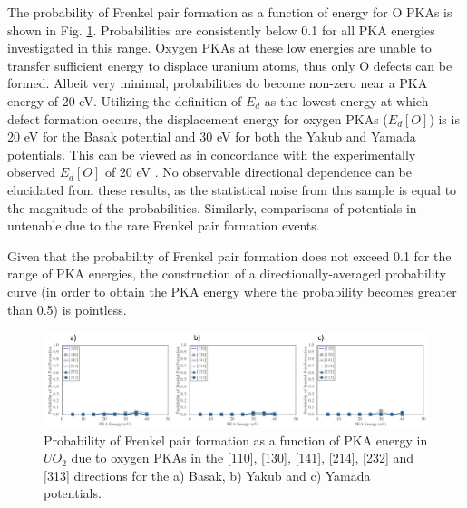 \documentclass[8pt]{article}   	%
\begin{document}
The probability of Frenkel pair formation as a function of energy for O PKAs is shown in Fig. \ref{fig:fpo}. Probabilities are consistently below 0.1 for all PKA energies investigated in this range. Oxygen PKAs at these low energies are unable to transfer sufficient energy to displace uranium atoms, thus only O defects can be formed. Albeit very minimal, probabilities do become non-zero near a PKA energy of 20 eV. Utilizing the definition of $E_d$ as the lowest energy at which defect formation occurs, the displacement energy for oxygen PKAs ($E_d [O]$) is is 20 eV for the Basak potential and 30 eV for both the Yakub and Yamada potentials. This can be viewed as in concordance with the experimentally observed $E_d [O]$ of 20 eV \cite{soullard1977,soullard1985}. No observable directional dependence can be elucidated from these results, as the statistical noise from this sample is equal to the magnitude of the probabilities. Similarly, comparisons of potentials in untenable due to the rare Frenkel pair formation events. 

Given that the probability of Frenkel pair formation does not exceed 0.1 for the range of PKA energies, the construction of a directionally-averaged probability curve (in order to obtain the PKA energy where the probability becomes greater than 0.5) is pointless. 

\begin{figure}[h]
 \centering
 \includegraphics[width=1.0\textwidth]{FP_O.png} 
 \caption{Probability of Frenkel pair formation as a function of PKA energy in $UO_2$ due to oxygen PKAs in the [110], [130], [141], [214], [232] and [313] directions for the a) Basak, b) Yakub and c) Yamada potentials.  }
 \label{fig:fpo}
\end{figure}

\FloatBarrier
\end{document}
